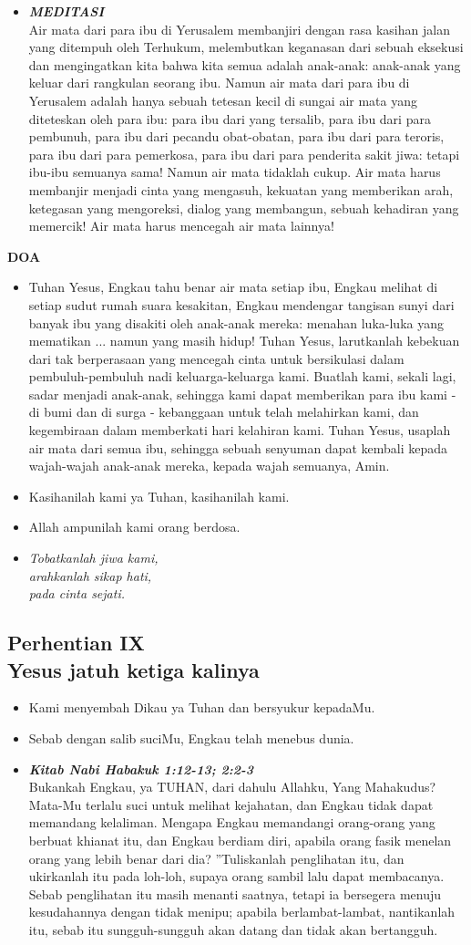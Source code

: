 \documentclass[a5paper,titlepage,11pt,openany]{scrbook}
\newcommand{\BU}[1]{\begin{itemize} \item[U:] #1 \end{itemize}}
\newcommand{\BP}[1]{\begin{itemize} \item[P:] #1 \end{itemize}}
\newcommand{\kamiMenyembah}{\BP{ Kami menyembah Dikau ya Tuhan dan bersyukur kepadaMu.}
\BU{Sebab dengan salib suciMu, Engkau telah menebus dunia.}
}
\newcommand{\kasihanilahKami}{\BP{Kasihanilah kami ya Tuhan, kasihanilah kami.}
\BU{Allah ampunilah kami orang berdosa.}}
\newcommand{\BPi}[2]
{\begin{itemize} \item[P1:] \textbf{\emph{#1}}\\#2 \end{itemize}}
\newcommand{\BPii}[1]
{\begin{itemize} \item[P2:] \textbf{\emph{MEDITASI}}\\#1 \end{itemize}}
\newcommand{\lagu}[2]{%
\begin{itemize}
\item[#1.] \it{#2}
\end{itemize}}
\newcommand{\henti}[2]{%
\subsection*{Perhentian #1\\#2 } 
\kamiMenyembah
}
\begin{document}
\BPii{
	Air mata dari para ibu di Yerusalem membanjiri dengan rasa kasihan jalan yang ditempuh oleh Terhukum, melembutkan keganasan dari sebuah eksekusi dan mengingatkan kita bahwa kita semua adalah anak-anak: anak-anak yang keluar dari rangkulan seorang ibu. Namun air mata dari para ibu di Yerusalem adalah hanya sebuah tetesan kecil di sungai air mata yang diteteskan oleh para ibu: para ibu dari yang tersalib, para ibu dari para pembunuh, para ibu dari pecandu obat-obatan, para ibu dari para teroris, para ibu dari para pemerkosa, para ibu dari para penderita sakit jiwa: tetapi ibu-ibu semuanya sama! Namun air mata tidaklah cukup. Air mata harus membanjir menjadi cinta yang mengasuh, kekuatan yang memberikan arah, ketegasan yang mengoreksi, dialog yang membangun, sebuah kehadiran yang memercik! Air mata harus mencegah air mata lainnya! }

\textbf{DOA}


\BU{Tuhan Yesus, Engkau tahu benar air mata setiap ibu, Engkau melihat di setiap sudut rumah suara kesakitan, Engkau mendengar tangisan sunyi dari banyak ibu yang disakiti oleh anak-anak mereka: menahan luka-luka yang mematikan ... namun yang masih hidup! Tuhan Yesus, larutkanlah kebekuan dari tak berperasaan yang mencegah cinta untuk bersikulasi dalam pembuluh-pembuluh nadi keluarga-keluarga kami. Buatlah kami, sekali lagi, sadar menjadi anak-anak, sehingga kami dapat memberikan para ibu kami - di bumi dan di surga - kebanggaan untuk telah melahirkan kami, dan kegembiraan dalam memberkati hari kelahiran kami. Tuhan Yesus, usaplah air mata dari semua ibu, sehingga sebuah senyuman dapat kembali kepada wajah-wajah anak-anak mereka, kepada wajah semuanya, Amin. }


\kasihanilahKami

\lagu{9}{Tobatkanlah jiwa kami,\\
arahkanlah sikap hati,\\
pada cinta sejati.}

\henti{IX}{Yesus jatuh ketiga kalinya}

\BPi{ Kitab Nabi Habakuk 1:12-13; 2:2-3 }{
	Bukankah Engkau, ya TUHAN, dari dahulu Allahku, Yang Mahakudus? Mata-Mu terlalu suci untuk melihat kejahatan, dan Engkau tidak dapat memandang kelaliman. Mengapa Engkau memandangi orang-orang yang berbuat khianat itu, dan Engkau berdiam diri, apabila orang fasik menelan orang yang lebih benar dari dia? ''Tuliskanlah penglihatan itu, dan ukirkanlah itu pada loh-loh, supaya orang sambil lalu dapat membacanya. Sebab penglihatan itu masih menanti saatnya, tetapi ia bersegera menuju kesudahannya dengan tidak menipu; apabila berlambat-lambat, nantikanlah itu, sebab itu sungguh-sungguh akan datang dan tidak akan bertangguh. }
\end{document}
